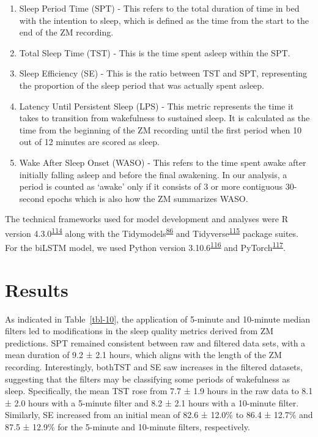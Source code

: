 \documentclass[
  9pt,
]{scrbook}
\providecommand{\tightlist}{%
  \setlength{\itemsep}{0pt}\setlength{\parskip}{0pt}}\usepackage{longtable,booktabs,array}
\begin{document}
\begin{enumerate}
\def\labelenumi{\arabic{enumi}.}
\tightlist
\item
  Sleep Period Time (SPT) - This refers to the total duration of time in
  bed with the intention to sleep, which is defined as the time from the
  start to the end of the ZM recording.
\item
  Total Sleep Time (TST) - This is the time spent asleep within the SPT.
\item
  Sleep Efficiency (SE) - This is the ratio between TST and SPT,
  representing the proportion of the sleep period that was actually
  spent asleep.
\item
  Latency Until Persistent Sleep (LPS) - This metric represents the time
  it takes to transition from wakefulness to sustained sleep. It is
  calculated as the time from the beginning of the ZM recording until
  the first period when 10 out of 12 minutes are scored as sleep.
\item
  Wake After Sleep Onset (WASO) - This refers to the time spent awake
  after initially falling asleep and before the final awakening. In our
  analysis, a period is counted as `awake' only if it consists of 3 or
  more contiguous 30-second epochs which is also how the ZM summarizes
  WASO.
\end{enumerate}

The technical frameworks used for model development and analyses were R
version
4.3.0\textsuperscript{\protect\hyperlink{ref-rcoreteam_2023}{114}} along
with the
Tidymodels\textsuperscript{\protect\hyperlink{ref-kuhn_tidymodels_2020}{86}}
and
Tidyverse\textsuperscript{\protect\hyperlink{ref-wickham_tidyverse_2019}{115}}
package suites. For the biLSTM model, we used Python version
3.10.6\textsuperscript{\protect\hyperlink{ref-vanrossum_python_2009}{116}}
and
PyTorch\textsuperscript{\protect\hyperlink{ref-paszke_pytorch_2019}{117}}.

\hypertarget{results-2}{%
\section{Results}\label{results-2}}

As indicated in Table~\ref{tbl-10}, the application of 5-minute and
10-minute median filters led to modifications in the sleep quality
metrics derived from ZM predictions. SPT remained consistent between raw
and filtered data sets, with a mean duration of 9.2 ± 2.1 hours, which
aligns with the length of the ZM recording. Interestingly, bothTST and
SE saw increases in the filtered datasets, suggesting that the filters
may be classifying some periods of wakefulness as sleep. Specifically,
the mean TST rose from 7.7 ± 1.9 hours in the raw data to 8.1 ± 2.0
hours with a 5-minute filter and 8.2 ± 2.1 hours with a 10-minute
filter. Similarly, SE increased from an initial mean of 82.6 ± 12.0\% to
86.4 ± 12.7\% and 87.5 ± 12.9\% for the 5-minute and 10-minute filters,
respectively.
\end{document}
